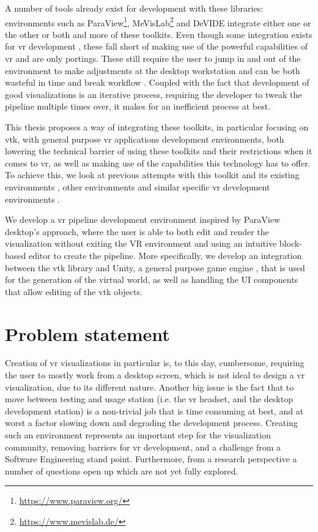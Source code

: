 A number of tools already exist for development with these libraries: environments such as ParaView\footnote{\url{https://www.paraview.org/}}, MeVisLab\footnote{\url{https://www.mevislab.de/}} and DeVIDE \cite{botha_devide_2004} integrate either one or the other or both and more of these toolkits. Even though some integration exists for \acrshort{vr} development \cite{sua_virtual_2015, shetty_immersive_2011}, these fall short of making use of the powerful capabilities of \acrshort{vr} and are only portings. These still require the user to jump in and out of the environment to make adjustments at the desktop workstation and can be both wasteful in time and break workflow \cite{belleman_interactive_2003, dreuning_visual_2016, kruis_creating_2017, schutte_virtual_2018}. Coupled with the fact that development of good visualizations is an iterative process, requiring the developer to tweak the pipeline multiple times over, it makes for an inefficient process at best.

This thesis proposes a way of integrating these toolkits, in particular focusing on \acrshort{vtk}, with general purpose \acrshort{vr} applications development environments, both lowering the technical barrier of using these toolkits and their restrictions when it comes to \acrshort{vr}, as well as making use of the capabilities this technology has to offer. To achieve this, we look at previous attempts with this toolkit and its existing environments \cite{dreuning_visual_2016, kruis_creating_2017, schutte_virtual_2018}, other environments \cite{wheeler_virtual_2018} and similar specific \acrshort{vr} development environments \cite{vanhorn_deep_2019}.

We develop a \acrshort{vr} pipeline development environment inspired by ParaView desktop's approach, where the user is able to both edit and render the visualization without exiting the VR environment and using an intuitive block-based editor to create the pipeline. More specifically, we develop an integration between the \acrshort{vtk} library and Unity, a general purpose game engine \cite{haas2014history}, that is used for the generation of the virtual world, as well as handling the UI components that allow editing of the \acrshort{vtk} objects.

\section{Problem statement}

Creation of \acrshort{vr} visualizations in particular is, to this day, cumbersome, requiring the user to mostly work from a desktop screen, which is not ideal to design a \acrshort{vr} visualization, due to its different nature. Another big issue is the fact that to move between testing and usage station (i.e. the \acrshort{vr} headset, and the desktop development station) is a non-trivial job that is time consuming at best, and at worst a factor slowing down and degrading the development process. Creating such an environment represents an important step for the visualization community, removing barriers for \acrshort{vr} development, and a challenge from a Software Engineering stand point. Furthermore, from a research perspective a number of questions open up which are not yet fully explored.

